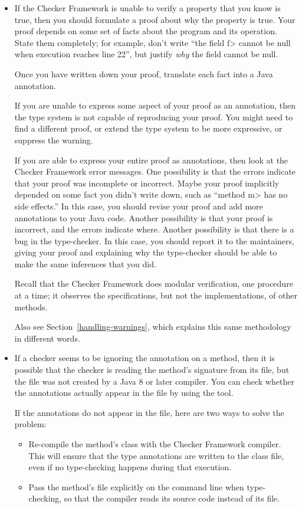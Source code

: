 \begin{itemize}
\item
  If the Checker Framework is unable to verify a property that you know is
  true, then you should formulate a proof about why the property is true.
  Your proof depends on some set of facts about the program and its
  operation.  State them completely; for example, don't write ``the field
  \<f> cannot be null when execution reaches line 22'', but justify
  \emph{why} the field cannot be null.

  Once you have written down your proof, translate each fact into a Java
  annotation.

  If you are unable to express some aspect of your proof as an annotation,
  then the type system is not capable of reproducing your proof.  You might
  need to find a different proof, or extend the type system to be more
  expressive, or suppress the warning.

  If you are able to express your entire proof as annotations, then look at
  the Checker Framework error messages.  One possibility is that the errors
  indicate that your proof was incomplete or incorrect.  Maybe your proof
  implicitly depended on some fact you didn't write down, such as ``method
  \<m> has no side effects.''  In this case, you should revise your proof
  and add more annotations to your Java code.  Another possibility is that
  your proof is incorrect, and the errors indicate where.  Another
  possibility is that there is a bug in the type-checker.  In this case,
  you should report it to the maintainers, giving your proof and explaining
  why the type-checker should be able to make the same inferences that you did.

  Recall that the Checker Framework does modular verification,
  one procedure at a time; it observes the specifications, but not the
  implementations, of other methods.

  Also see Section~\ref{handling-warnings}, which explains this same
  methodology in different words.

\item
If a checker seems to be ignoring the annotation on a method, then it is
possible that the checker is reading the method's signature from its
 file, but the  file was not created by a Java 8
or later compiler.
You can check whether the annotations actually appear in the
 file by using the  tool.

If the annotations do not appear in the  file, here are two
ways to solve the problem:
\begin{itemize}
\item
  Re-compile the method's class with the Checker Framework compiler.  This will
  ensure that the type annotations are written to the class file, even if
  no type-checking happens during that execution.
\item
  Pass the method's file explicitly on the command line when type-checking,
  so that the compiler reads its source code instead of its 
  file.
\end{itemize}


\end{itemize}
